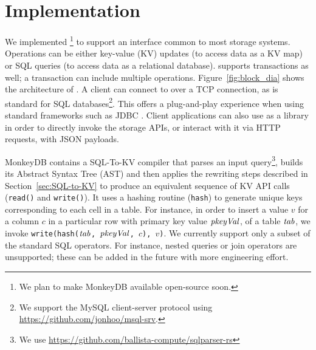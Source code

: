 
\section{Implementation}
\label{sec:impl}

We implemented \tool{}\footnote{We plan to make MonkeyDB available open-source
soon.} to support an interface common to most storage
systems. Operations can be either key-value (KV) updates (to access data as a KV map)
or SQL queries (to access data as a relational database). \tool{} supports
transactions as well; a transaction can include multiple operations. 
Figure~\ref{fig:block_dia} shows the architecture of \tool{}. 
A client can connect to \tool{} over a TCP connection, as is
standard for SQL databases\footnote{We support the MySQL client-server
protocol using \url{https://github.com/jonhoo/msql-srv}.}. 
This
offers a plug-and-play experience when using
standard frameworks such as JDBC \cite{jdbc}. 
Client applications can also use \tool{} as a library in order to directly invoke the storage APIs,
or interact with it via HTTP requests, with JSON payloads.  


MonkeyDB contains a SQL-To-KV compiler that parses an input query\footnote{We
use \url{https://github.com/ballista-compute/sqlparser-rs}}, builds
its Abstract Syntax Tree (AST) and then applies the rewriting steps described in Section~\ref{sec:SQL-to-KV} 
to produce an equivalent sequence of KV API calls ({\tt read()} and {\tt write()}).
It uses a hashing routine ({\tt hash}) to generate unique keys corresponding to each cell in a table.
For instance, in order to insert a value $v$ for a column $c$ in a particular row with primary key value $\mathit{pkeyVal}$, of a table $\mathit{tab}$, 
we invoke {\tt write(hash($\mathit{tab}$, $\mathit{pkeyVal}$, $c$), $v$)}. 
We currently support only a subset of the standard SQL operators. For instance, 
nested queries or join operators are unsupported; these can be added in the
future with more engineering effort.

